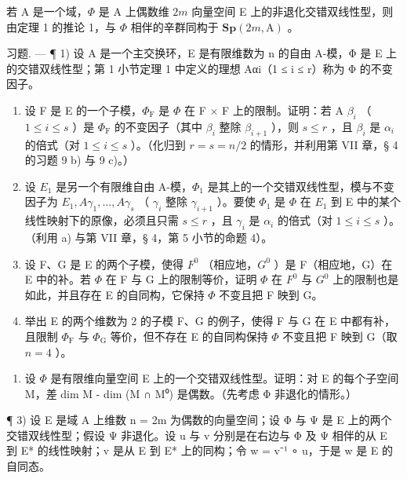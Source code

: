 若 A 是一个域，\(\Phi\) 是 A 上偶数维 \(2m\) 向量空间 E 上的非退化交错双线性型，则由定理 1 的推论 1，与 \(\Phi\) 相伴的辛群同构于 \(\mathbf{Sp}(2m, \mathrm{A})\) 。

习题. --- ¶ 1) 设 A 是一个主交换环，E 是有限维数为 n 的自由 A-模，Φ 是 E 上的交错双线性型；第 1 小节定理 1 中定义的理想 Aαi（1 ≤ i ≤ r）称为 Φ 的不变因子。

\begin{enumerate}
\def\labelenumi{\alph{enumi})}
\item
  设 F 是 E 的一个子模，\(\Phi_{\mathrm{F}}\) 是 \(\Phi\) 在 F × F 上的限制。证明：若 A \(\beta_{i}\) （ \(1 \leqslant i \leqslant s\) ）是 \(\Phi_{\mathrm{F}}\) 的不变因子（其中 \(\beta_{i}\) 整除 \(\beta_{i+1}\) ），则 \(s \leqslant r\) ，且 \(\beta_{i}\) 是 \(\alpha_{i}\) 的倍式（对 \(1 \leqslant i \leqslant s\) ）。（化归到 \(r = s = n/2\) 的情形，并利用第 VII 章，§ 4 的习题 9 b) 与 9 c)。）
\item
  设 \(E_{1}\) 是另一个有限维自由 A-模，\(\Phi_{1}\) 是其上的一个交错双线性型，模与不变因子为 \(E_{1}, A\gamma_{1}, \ldots, A\gamma_{s}\) （ \(\gamma_{i}\) 整除 \(\gamma_{i+1}\) ）。要使 \(\Phi_{1}\) 是 \(\Phi\) 在 \(E_{1}\) 到 E 中的某个线性映射下的原像，必须且只需 \(s \leqslant r\) ，且 \(\gamma_{i}\) 是 \(\alpha_{i}\) 的倍式（对 \(1 \leqslant i \leqslant s\) ）。（利用 a) 与第 VII 章，§ 4，第 5 小节的命题 4）。
\item
  设 F、G 是 E 的两个子模，使得 \(F^{0}\) （相应地，\(G^{0}\) ）是 F（相应地，G）在 E 中的补。若 \(\Phi\) 在 F 与 G 上的限制等价，证明 \(\Phi\) 在 \(F^{0}\) 与 \(G^{0}\) 上的限制也是如此，并且存在 E 的自同构，它保持 \(\Phi\) 不变且把 F 映到 G。
\item
  举出 E 的两个维数为 2 的子模 F、G 的例子，使得 F 与 G 在 E 中都有补，且限制 \(\Phi_{\mathrm{F}}\) 与 \(\Phi_{\mathrm{G}}\) 等价，但不存在 E 的自同构保持 \(\Phi\) 不变且把 F 映到 G（取 \(n = 4\) ）。
\end{enumerate}

\begin{enumerate}
\def\labelenumi{\arabic{enumi})}
\setcounter{enumi}{1}
\tightlist
\item
  设 \(\Phi\) 是有限维向量空间 E 上的一个交错双线性型。证明：对 E 的每个子空间 M，差 dim M - dim (M ∩ M⁰) 是偶数。（先考虑 Φ 非退化的情形。）
\end{enumerate}

¶ 3) 设 E 是域 A 上维数 n = 2m 为偶数的向量空间；设 Φ 与 Ψ 是 E 上的两个交错双线性型；假设 Ψ 非退化。设 u 与 v 分别是在右边与 Φ 及 Ψ 相伴的从 E 到 E* 的线性映射；v 是从 E 到 E* 上的同构；令 w = v⁻¹ ∘ u，于是 w 是 E 的自同态。

